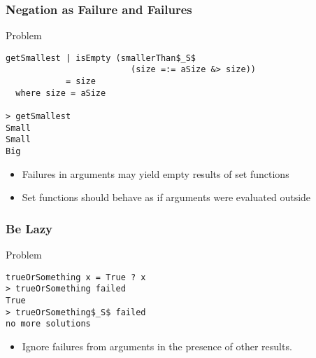 \documentclass[utf8]{beamer}
\begin{document}
\begin{frame}[fragile]
\frametitle{Negation as Failure and Failures}
\begin{block}{Problem}
\begin{lstlisting}[mathescape]
getSmallest | isEmpty (smallerThan$_S$ 
                         (size =:= aSize &> size)) 
            = size
  where size = aSize

> getSmallest
Small
Small
Big
\end{lstlisting}
\end{block}
\begin{itemize}
 \item Failures in arguments may yield empty results of set functions
 \item Set functions should behave as if arguments were
       evaluated outside
\end{itemize}
\end{frame}

\begin{frame}[fragile]
\frametitle{Be Lazy}
\begin{block}{Problem}
\begin{lstlisting}[mathescape]
trueOrSomething x = True ? x
> trueOrSomething failed
True
> trueOrSomething$_S$ failed
no more solutions
\end{lstlisting}
\end{block}
\begin{itemize}
\item Ignore failures from arguments in the presence of other results.
\end{itemize}
\end{frame}
\end{document}
